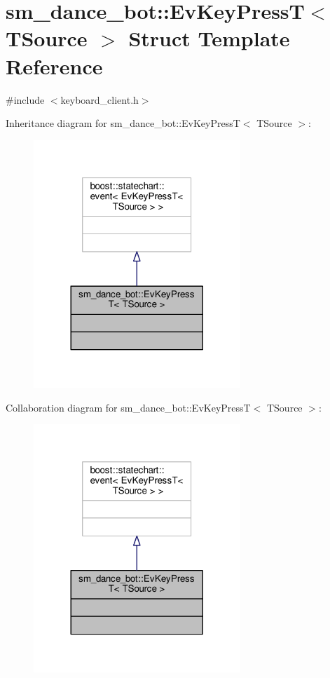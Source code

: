 \hypertarget{structsm__dance__bot_1_1EvKeyPressT}{}\section{sm\+\_\+dance\+\_\+bot\+:\+:Ev\+Key\+PressT$<$ T\+Source $>$ Struct Template Reference}
\label{structsm__dance__bot_1_1EvKeyPressT}


{\ttfamily \#include $<$keyboard\+\_\+client.\+h$>$}



Inheritance diagram for sm\+\_\+dance\+\_\+bot\+:\+:Ev\+Key\+PressT$<$ T\+Source $>$\+:
\nopagebreak
\begin{figure}[H]
\begin{center}
\leavevmode
\includegraphics[width=221pt]{structsm__dance__bot_1_1EvKeyPressT__inherit__graph}
\end{center}
\end{figure}


Collaboration diagram for sm\+\_\+dance\+\_\+bot\+:\+:Ev\+Key\+PressT$<$ T\+Source $>$\+:
\nopagebreak
\begin{figure}[H]
\begin{center}
\leavevmode
\includegraphics[width=221pt]{structsm__dance__bot_1_1EvKeyPressT__coll__graph}
\end{center}
\end{figure}


